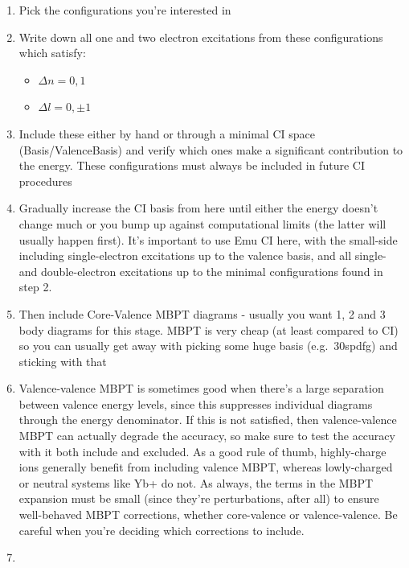 \documentclass{report}
\begin{document}
\begin{enumerate}
\item
  Pick the configurations you're interested in\\
\item
  Write down all one and two electron excitations from these
  configurations which satisfy:

  \begin{itemize}
  \item
    $\Delta n = 0, 1$\\
  \item
    $\Delta l = 0, \pm 1$\\
  \end{itemize}
\item
  Include these either by hand or through a minimal CI space
  (Basis/ValenceBasis) and verify which ones make a significant
  contribution to the energy. These configurations must always be
  included in future CI procedures\\
\item
  Gradually increase the CI basis from here until either the energy
  doesn't change much or you bump up against computational limits (the latter will usually happen
  first). It's important to use Emu CI here, with the small-side including single-electron excitations
  up to the valence basis, and all single- and double-electron excitations up to the minimal
  configurations found in step 2.
\item
  Then include Core-Valence MBPT diagrams - usually you want 1, 2 and 3
  body diagrams for this stage. MBPT is very cheap (at least compared to
  CI) so you can usually get away with picking some huge basis
  (e.g.~30spdfg) and sticking with that\\
\item
  Valence-valence MBPT is sometimes good when there's a large separation
  between valence energy levels, since this suppresses individual
  diagrams through the energy denominator. If this is not satisfied,
  then valence-valence MBPT can actually degrade the accuracy, so make
  sure to test the accuracy with it both include and excluded. As a good
  rule of thumb, highly-charge ions generally benefit from including
  valence MBPT, whereas lowly-charged or neutral systems like Yb+ do
  not. As always, the terms in the MBPT expansion must be small (since they're perturbations, after all)
  to ensure well-behaved MBPT corrections, whether core-valence or valence-valence. Be careful when
  you're deciding which corrections to include.
\item

\end{enumerate}
\end{document}
